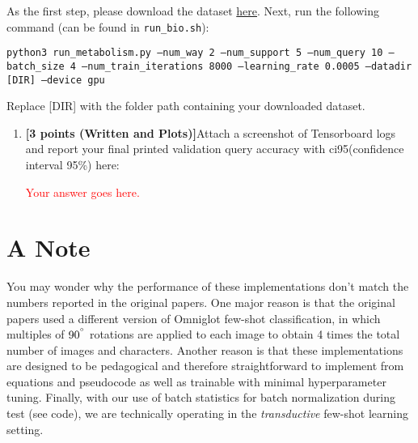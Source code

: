 \documentclass[12pt]{article}
\begin{document}
As the first step, please download the dataset \href{https://drive.google.com/file/d/1NNYesgMJWgrBd7Xb1Dusy-MQP_FYX-Mf/view?usp=drive_link}{here}. Next, run the following command (can be found in \texttt{run\_bio.sh}):

\texttt{python3 run\_metabolism.py --num\_way 2 --num\_support 5 --num\_query 10 --batch\_size 4 --num\_train\_iterations 8000 --learning\_rate 0.0005 --datadir [DIR] --device gpu}

Replace [DIR] with the folder path containing your downloaded dataset.
\begin{enumerate}
    \item \textbf{[3 points (Written and Plots)]}Attach a screenshot of Tensorboard logs and report your final printed validation query accuracy with ci95(confidence interval 95\%) here:
    
    \textcolor{red}{Your answer goes here.}
\end{enumerate}
\section*{A Note}
You may wonder why the performance of these implementations don't match the numbers reported in the original papers. One major reason is that the original papers used a different version of Omniglot few-shot classification, in which multiples of $90^{\degree}$ rotations are applied to each image to obtain 4 times the total number of images and characters. Another reason is that these implementations are designed to be pedagogical and therefore straightforward to implement from equations and pseudocode as well as trainable with minimal hyperparameter tuning. Finally, with our use of batch statistics for batch normalization during test (see code), we are technically operating in the \emph{transductive} few-shot learning setting.

\newpage


\end{document}
